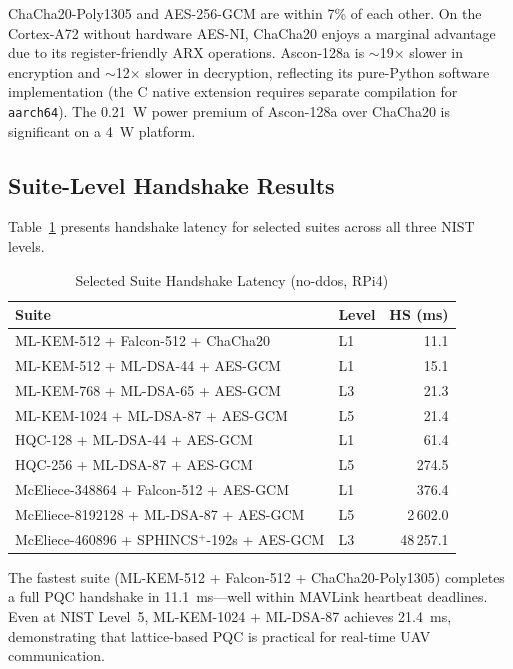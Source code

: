 \documentclass[conference]{IEEEtran}
\begin{document}
ChaCha20-Poly1305 and AES-256-GCM are within 7\% of each other.
On the Cortex-A72 without hardware AES-NI, ChaCha20 enjoys a marginal advantage due to its register-friendly ARX operations.
Ascon-128a is $\sim$19$\times$ slower in encryption and $\sim$12$\times$ slower in decryption, reflecting its pure-Python software implementation (the C native extension requires separate compilation for \texttt{aarch64}).
The \SI{0.21}{\watt} power premium of Ascon-128a over ChaCha20 is significant on a \SI{4}{\watt} platform.

\subsection{Suite-Level Handshake Results}

Table~\ref{tab:suite-handshake} presents handshake latency for selected suites across all three NIST levels.

\begin{table}[t]
\centering
\caption{Selected Suite Handshake Latency (no-ddos, RPi4)}
\label{tab:suite-handshake}
\small
\begin{tabular}{@{}llr@{}}
\toprule
\textbf{Suite} & \textbf{Level} & \textbf{HS (ms)} \\
\midrule
ML-KEM-512 + Falcon-512 + ChaCha20 & L1 & 11.1 \\
ML-KEM-512 + ML-DSA-44 + AES-GCM & L1 & 15.1 \\
ML-KEM-768 + ML-DSA-65 + AES-GCM & L3 & 21.3 \\
ML-KEM-1024 + ML-DSA-87 + AES-GCM & L5 & 21.4 \\
HQC-128 + ML-DSA-44 + AES-GCM & L1 & 61.4 \\
HQC-256 + ML-DSA-87 + AES-GCM & L5 & 274.5 \\
McEliece-348864 + Falcon-512 + AES-GCM & L1 & 376.4 \\
McEliece-8192128 + ML-DSA-87 + AES-GCM & L5 & 2\,602.0 \\
McEliece-460896 + SPHINCS$^+$-192s + AES-GCM & L3 & 48\,257.1 \\
\bottomrule
\end{tabular}
\end{table}

The fastest suite (ML-KEM-512 + Falcon-512 + ChaCha20-Poly1305) completes a full PQC handshake in \SI{11.1}{\milli\second}---well within MAVLink heartbeat deadlines.
Even at NIST Level~5, ML-KEM-1024 + ML-DSA-87 achieves \SI{21.4}{\milli\second}, demonstrating that lattice-based PQC is practical for real-time UAV communication.
\end{document}

